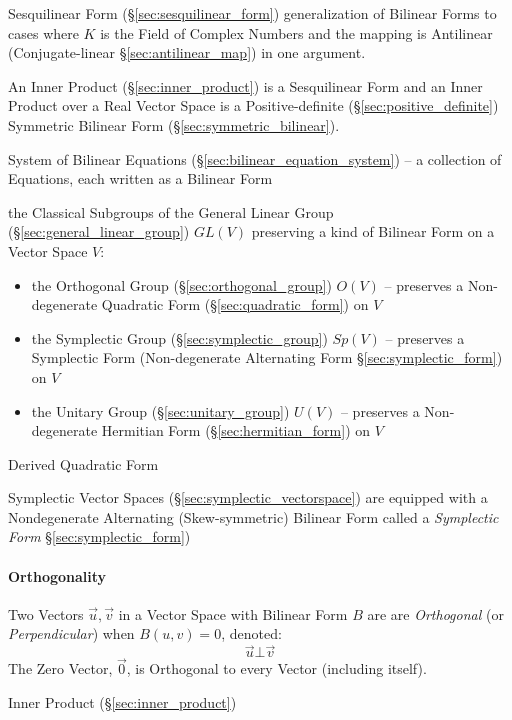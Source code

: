 {{Sesquilinear Form (\S\ref{sec:sesquilinear_form}) generalization of Bilinear
Forms to cases where $K$ is the Field of Complex Numbers and the mapping is
Antilinear (Conjugate-linear \S\ref{sec:antilinear_map}) in one argument.

An Inner Product (\S\ref{sec:inner_product}) is a Sesquilinear Form and an
Inner Product over a Real Vector Space is a Positive-definite
(\S\ref{sec:positive_definite}) Symmetric Bilinear Form
(\S\ref{sec:symmetric_bilinear}).

\fist System of Bilinear Equations (\S\ref{sec:bilinear_equation_system}) -- a
collection of Equations, each written as a Bilinear Form

the Classical Subgroups of the General Linear Group
(\S\ref{sec:general_linear_group}) $GL(V)$ preserving a kind of Bilinear Form
on a Vector Space $V$:
\begin{itemize}
  \item the Orthogonal Group (\S\ref{sec:orthogonal_group}) $O(V)$ -- preserves
    a Non-degenerate Quadratic Form (\S\ref{sec:quadratic_form}) on $V$
  \item the Symplectic Group (\S\ref{sec:symplectic_group}) $Sp(V)$
    -- preserves a Symplectic Form (Non-degenerate Alternating Form
    \S\ref{sec:symplectic_form}) on $V$
  \item the Unitary Group (\S\ref{sec:unitary_group}) $U(V)$
    -- preserves a Non-degenerate Hermitian Form (\S\ref{sec:hermitian_form})
    on $V$
\end{itemize}

Derived Quadratic Form

Symplectic Vector Spaces (\S\ref{sec:symplectic_vectorspace}) are equipped with
a Nondegenerate Alternating (Skew-symmetric) Bilinear Form called a
\emph{Symplectic Form} \S\ref{sec:symplectic_form})



\paragraph{Orthogonality}\label{sec:orthogonality}\hfill

Two Vectors $\vec{u}, \vec{v}$ in a Vector Space with Bilinear Form $B$ are are
\emph{Orthogonal} (or \emph{Perpendicular}) when $B(u,v) = 0$, denoted:
\[
  \vec{u} \bot \vec{v}
\]
The Zero Vector, $\vec{0}$, is Orthogonal to every Vector (including itself).

\fist Inner Product (\S\ref{sec:inner_product})

}}
